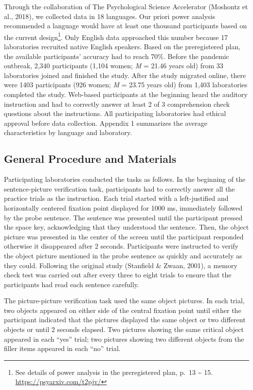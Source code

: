 \documentclass[
  man]{apa6}
\begin{document}
Through the collaboration of The Psychological Science Accelerator (Moshontz et al., 2018), we collected data in 18 languages. Our priori power analysis recommended a language would have at least one thousand participants based on the current design\footnote{See details of power analysis in the preregistered plan, p.~13 \textasciitilde{} 15. \url{https://psyarxiv.com/t2pjv/}}. Only English data approached this number because 17 laboratories recruited native English speakers. Based on the preregistered plan, the available participants' accuracy had to reach 70\%. Before the pandemic outbreak, 2,340 participants (1,104 women; \emph{M} = 21.46 years old) from 33 laboratories joined and finished the study. After the study migrated online, there were 1403 participants (926 women; \emph{M} = 23.75 years old) from 1,403 laboratories completed the study. Web-based participants at the beginning heard the auditory instruction and had to correctly answer at least 2 of 3 comprehension check questions about the instructions. All participating laboratories had ethical approval before data collection. Appendix 1 summarizes the average characteristics by language and laboratory.

\hypertarget{general-procedure-and-materials}{%
\subsection{General Procedure and Materials}\label{general-procedure-and-materials}}

Participating laboratories conducted the tasks as follows. In the beginning of the sentence-picture verification task, participants had to correctly answer all the practice trials as the instruction. Each trial started with a left-justified and horizontally centered fixation point displayed for 1000 ms, immediately followed by the probe sentence. The sentence was presented until the participant pressed the space key, acknowledging that they understood the sentence. Then, the object picture was presented in the center of the screen until the participant responded otherwise it disappeared after 2 seconds. Participants were instructed to verify the object picture mentioned in the probe sentence as quickly and accurately as they could. Following the original study (Stanfield \& Zwaan, 2001), a memory check test was carried out after every three to eight trials to ensure that the participants had read each sentence carefully.

The picture-picture verification task used the same object pictures. In each trial, two objects appeared on either side of the central fixation point until either the participant indicated that the pictures displayed the same object or two different objects or until 2 seconds elapsed. Two pictures showing the same critical object appeared in each ``yes'' trial; two pictures showing two different objects from the filler items appeared in each ``no'' trial.
\end{document}
